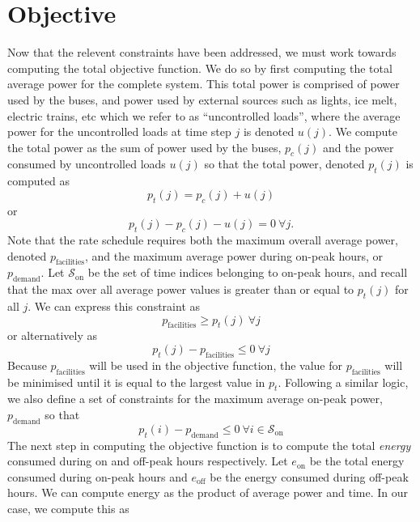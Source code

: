 \section{Objective}
\par Now that the relevent constraints have been addressed, we must work towards computing the total objective function. We do so by first computing the total average power for the complete system. This total power is comprised of power used by the buses, and power used by external sources such as lights, ice melt, electric trains, etc which we refer to as ``uncontrolled loads'', where the average power for the uncontrolled loads at time step $j$ is denoted $u(j)$. We compute the total power as the sum of power used by the buses, $p_c(j)$ and the power consumed by uncontrolled loads $u(j)$ so that the total power, denoted $p_t(j)$ is computed as 
\begin{equation*}
	p_t(j) = p_c(j) + u(j)
\end{equation*}
or 
\begin{equation}
	p_t(j) - p_c(j) - u(j) = 0 \ \forall j.
\end{equation}
Note that the rate schedule requires both the maximum overall average power, denoted $p_{\text{facilities}}$, and the maximum average power during on-peak hours, or $p_{\text{demand}}$. Let $\mathcal{S}_{\text{on}}$ be the set of time indices belonging to on-peak hours, and recall that the max over all average power values is greater than or equal to $p_t(j)$ for all $j$. We can express this constraint as
\begin{equation*}
	p_{\text{facilities}} \ge p_t(j) \ \forall j
\end{equation*}
or alternatively as
\begin{equation}
	p_t(j) - p_{\text{facilities}} \le 0 \ \forall j
\end{equation}
Because $p_{\text{facilities}}$ will be used in the objective function, the value for $p_{\text{facilities}}$ will be minimised until it is equal to the largest value in $p_t$. Following a similar logic, we also define a set of constraints for the maximum average on-peak power, $p_{\text{demand}}$ so that
\begin{equation}
	p_t(i) - p_{\text{demand}} \le 0 \ \forall i \in \mathcal{S}_{\text{on}}
\end{equation}
The next step in computing the objective function is to compute the total {\it energy} consumed during on and off-peak hours respectively.  Let $e_{\text{on}}$ be the total energy consumed during on-peak hours and $e_{\text{off}}$ be the energy consumed during off-peak hours. We can compute energy as the product of average power and time.  In our case, we compute this as 
